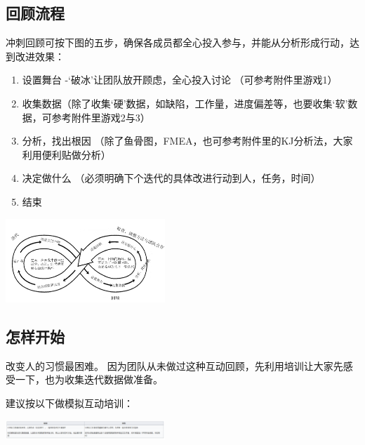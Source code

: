 \hypertarget{ux56deux987eux6d41ux7a0b}{%
\subsection{回顾流程}\label{ux56deux987eux6d41ux7a0b}}

冲刺回顾可按下图的五步，确保各成员都全心投入参与，并能从分析形成行动，达到改进效果：\\

\begin{enumerate}
\tightlist
\item
  设置舞台 -`破冰'让团队放开顾虑，全心投入讨论 （可参考附件里游戏1）
\item
  收集数据（除了收集`硬'数据，如缺陷，工作量，进度偏差等，也要收集`软'数据，可参考附件里游戏2与3）
\item
  分析，找出根因
  （除了鱼骨图，FMEA，也可参考附件里的KJ分析法，大家利用便利贴做分析）
\item
  决定做什么 （必须明确下个迭代的具体改进行动到人，任务，时间）
\item
  结束
\end{enumerate}


\includegraphics[width=6cm]{RetrospectiveScreenshot_2021-09-21_173119.png}

\hypertarget{ux600eux6837ux5f00ux59cb}{%
\subsection{怎样开始}\label{ux600eux6837ux5f00ux59cb}}

改变人的习惯最困难。
因为团队从未做过这种互动回顾，先利用培训让大家先感受一下，也为收集迭代数据做准备。

建议按以下做模拟互动培训：


\includegraphics[width=6cm]{Screenshotfrom2022-12-2921-12-44.png}

